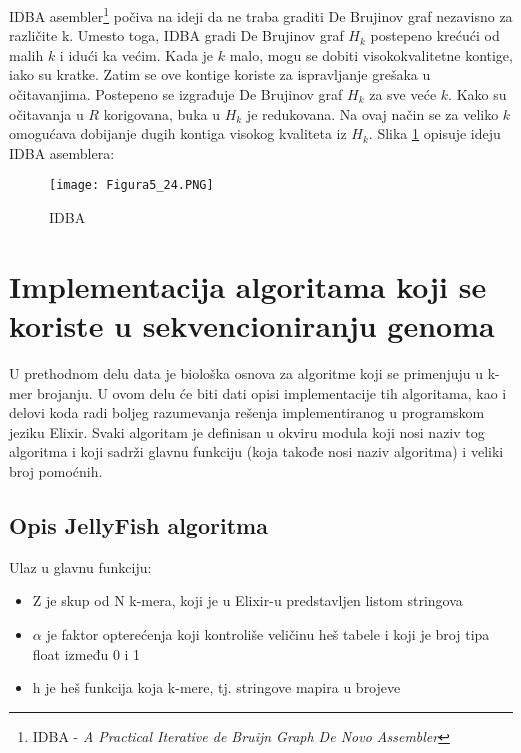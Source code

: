 \documentclass[12pt,oneside]{memoir}
\begin{document}
IDBA asembler\footnote{IDBA - \textit{A Practical Iterative de Bruijn Graph De Novo Assembler}} počiva na ideji da ne traba graditi De Brujinov graf nezavisno za različite k. Umesto toga, IDBA gradi De Brujinov graf $H_k$ postepeno krećući od malih $k$ i idući ka većim. Kada je $k$ malo, mogu se dobiti visokokvalitetne kontige, iako su kratke. Zatim se ove kontige koriste za ispravljanje grešaka u očitavanjima. Postepeno se izgrađuje De Brujinov graf $H_k$ za sve veće $k$. Kako su očitavanja u $R$ korigovana, buka u $H_k$ je redukovana. Na ovaj način se za veliko $k$ omogućava dobijanje dugih kontiga visokog kvaliteta iz $H_k$. Slika \ref{fig:17} opisuje ideju IDBA asemblera:

\begin{figure}[!ht]
\centering
\texttt{[image: Figura5\_24.PNG]}
\caption{IDBA}
\label{fig:17}
\end{figure}

\chapter{Implementacija algoritama koji se koriste u sekvencioniranju genoma}

U prethodnom delu data je biološka osnova za algoritme koji se primenjuju u k-mer brojanju. U ovom delu će biti dati opisi implementacije tih algoritama, kao i delovi koda radi boljeg razumevanja rešenja implementiranog u programskom jeziku Elixir. Svaki algoritam je definisan u okviru modula koji nosi naziv tog algoritma i koji sadrži glavnu funkciju (koja takođe nosi naziv algoritma) i veliki broj pomoćnih.

\section{Opis JellyFish algoritma}

Ulaz u glavnu funkciju:

\begin{itemize}
    \item {Z je skup od N k-mera, koji je u Elixir-u predstavljen listom stringova}
    \item {$\alpha$ je faktor opterećenja koji kontroliše veličinu heš tabele i koji je broj tipa float između 0 i 1}
    \item {h je heš funkcija koja k-mere, tj. stringove mapira u brojeve}
\end{itemize}

\newpage
\end{document}
